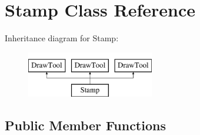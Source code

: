 \hypertarget{classStamp}{\section{Stamp Class Reference}
\label{classStamp}
}
Inheritance diagram for Stamp\-:\begin{figure}[H]
\begin{center}
\leavevmode
\includegraphics[height=2.000000cm]{classStamp}
\end{center}
\end{figure}
\subsection*{Public Member Functions}
